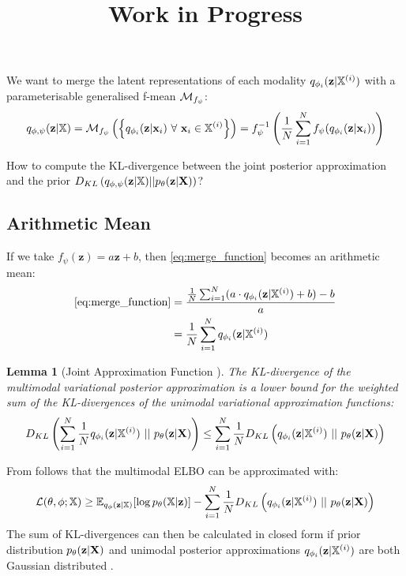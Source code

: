 \documentclass[english]{article}
\title{Work in Progress}
\date{}
\newtheorem{lemma}{Lemma}
\begin{document}
    \maketitle


    We want to merge the latent representations of each modality $q_{\phi_i}(\textbf{z}|\mathbb{X}^{(i)})$ with a parameterisable generalised f-mean $\mathcal{M}_{f_{\psi}}$:
    \begin{equation}
        \label{eq:merge_function}
        q_{\phi, \psi}(\textbf{z} | \mathbb{X}) = \mathcal{M}_{f_{\psi}}\left( \left\{ q_{\phi _i}(\textbf{z}|\textbf{x}_i)\ \forall\ \textbf{x}_i \in \mathbb{X}^{(i)} \right\} \right) = f_{\psi}^{-1}\left( \frac{1}{N} \sum ^N _{i=1} f_{\psi}(q_{\phi _i}(\textbf{z}|\textbf{x}_i)) \right)
    \end{equation}

    How to compute the KL-divergence between the joint posterior approximation and the prior $D_{KL} \left( q_{\phi, \psi}(\textbf{z}|\mathbb{X}) || p_{\theta}(\textbf{z}|\textbf{X}) \right)$?

    \subsection*{Arithmetic Mean}
    If we take $f_{\psi}(\textbf{z}) = a\textbf{z} + b$, then \cref{eq:merge_function} becomes an arithmetic mean:
    \begin{equation}
        \begin{split}
            \Cref{eq:merge_function} & = \frac{\frac{1}{N} \sum ^N _{i=1} (a \cdot \approxdistri + b) -b }{a}\\
            & = \frac{1}{N} \sum ^N _{i=1} \approxdistri
        \end{split}
    \end{equation}
    \begin{lemma}[Joint Approximation Function \citep{sutter_multimodal_2020}]
        \label{lemma:DklLowerBound}
        The KL-divergence of the multimodal variational posterior approximation is a lower bound for the weighted sum of the KL-divergences of the unimodal variational approximation functions:
        \begin{equation}
            D_{KL} \left( \sum _{i=1} ^N \frac{1}{N}\approxdistri\ ||\ \truedistr \right) \leq \sum _{i=1} ^N \frac{1}{N} D_{KL} \left( \approxdistri\ ||\ \truedistr \right)
        \end{equation}
    \end{lemma}

    From  follows that the multimodal ELBO can be approximated with:
    \begin{equation}
        \mathcal{L}(\theta, \phi; \mathbb{X}) \geq \mathbb{E}_{q_{\phi}(\textbf{z}|\mathbb{X})}[\log p_{\theta}(\mathbb{X}|\textbf{z})] - \sum _{i=1} ^N \frac{1}{N} D_{KL} \left( q_{\phi_i}(\textbf{z}|\mathbb{X}^{(i)})\ ||\ p_{\theta}(\textbf{z}|\textbf{X}) \right)
    \end{equation}
    The sum of KL-divergences can then be calculated in closed form if prior distribution $p_{\theta}(\textbf{z}|\textbf{X})$ and unimodal posterior approximations $q_{\phi_i}(\textbf{z}|\mathbb{X}^{(i)})$ are both Gaussian distributed \citep{sutter_multimodal_2020}.
\end{document}
